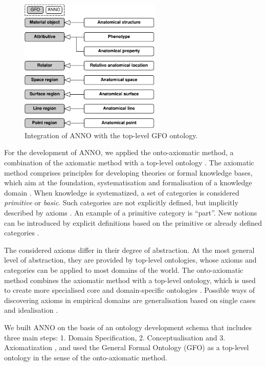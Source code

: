 \documentclass[sw]{iosart2x}
\begin{document}
\fi
\begin{figure}[h]
\includegraphics[width=0.6\textwidth]{img/gfo.pdf}
\caption{Integration of ANNO with the top-level GFO ontology.}\label{fig:gfo}
\end{figure}

For the development of ANNO, we applied the onto-axiomatic method, a combination of the axiomatic method with a top-level ontology \citep{baumann2014, herre2010}.
The axiomatic method comprises principles for developing theories or formal knowledge bases, which aim at the foundation, systematisation and formalisation of a knowledge domain \citep{baumann2014, herre2010}.
When knowledge is systematized, a set of categories is considered \emph{primitive} or \emph{basic}.
Such categories are not explicitly defined, but implicitly described by axioms \citep{Hilbert1918}.
An example of a primitive category is \enquote{part}.
New notions can be introduced by explicit definitions based on the primitive or already defined categories \citep{herre2010}.

The considered axioms differ in their degree of abstraction.
At the most general level of abstraction, they are provided by top-level ontologies, whose axioms and categories can be applied to most domains of the world.
The onto-axiomatic method combines the axiomatic method with a top-level ontology, which is used to create more specialised core and domain-specific ontologies \citep{baumann2014}.
Possible ways of discovering axioms in empirical domains are generalisation based on single cases and idealisation \citep{baumann2011}.

We built ANNO on the basis of an ontology development schema that includes three main steps: 1. Domain Specification, 2. Conceptualisation and 3. Axiomatization \citep{herre2010}, and used the General Formal Ontology (GFO) \citep{Loebe2022, Burek2020, herre2010} as a top-level ontology in the sense of the onto-axiomatic method.
\end{document}
